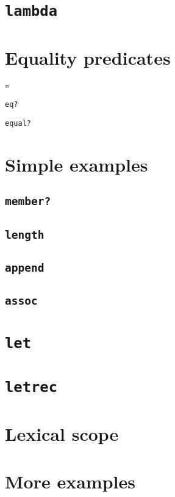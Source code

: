 \documentclass{book}
\begin{document}
\section{\texttt{lambda}}


\section{Equality predicates}

\verb|=|

\verb|eq?|

\verb|equal?|

\section{Simple examples}

\subsection{\texttt{member?}}

\subsection{\texttt{length}}

\subsection{\texttt{append}}

\subsection{\texttt{assoc}}

\section{\texttt{let}}

\section{\texttt{letrec}}

\section{Lexical scope}

\section{More examples}
\end{document}
